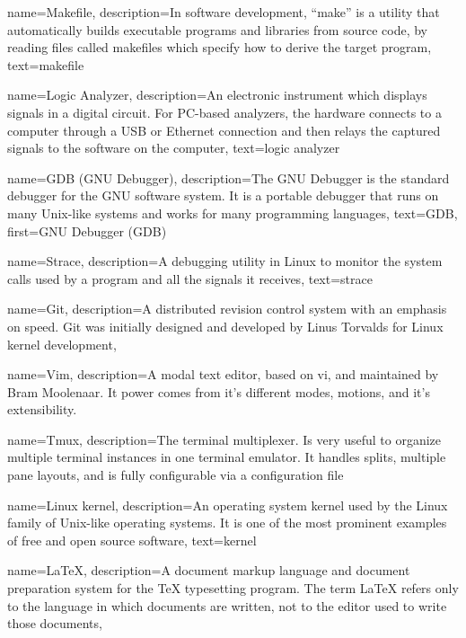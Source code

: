{
  name=Makefile,
  description={In software development, ``make'' is a utility that
    automatically builds executable programs and libraries from source
    code, by reading files called makefiles which specify how to
    derive the target program},
  text=makefile
}

{
  name=Logic Analyzer,
  description={An electronic instrument which displays signals in a
    digital circuit. For PC-based analyzers, the hardware connects to
    a computer through a USB or Ethernet connection and then relays
    the captured signals to the software on the computer},
  text=logic analyzer
}

{
  name=GDB (GNU Debugger),
  description={The GNU Debugger is the standard debugger for the GNU
    software system. It is a portable debugger that runs on many
    Unix-like systems and works for many programming languages},
  text=GDB,
  first=GNU Debugger (GDB)
}

{
  name=Strace,
  description={A debugging utility in Linux to monitor the system
    calls used by a program and all the signals it receives},
  text=strace
}

{
  name=Git,
  description={A distributed revision control system with an emphasis
    on speed. Git was initially designed and developed by Linus
    Torvalds for Linux kernel development},
}

{
  name=Vim,
  description={A modal text editor, based on vi, and maintained by Bram Moolenaar.
  It power comes from it's different modes, motions, and it's extensibility.}
}

{
  name=Tmux,
  description={The terminal multiplexer. Is very useful to organize multiple terminal instances in
  one terminal emulator. It handles splits, multiple pane layouts, and is fully configurable via a
  configuration file}
}

{
  name=Linux kernel,
  description={An operating system kernel used by the Linux family of
    Unix-like operating systems. It is one of the most prominent
    examples of free and open source software},
  text=kernel
}

{
  name=\LaTeX,
  description={A document markup language and document preparation
    system for the TeX typesetting program. The term LaTeX refers only
    to the language in which documents are written, not to the editor
    used to write those documents},
}

